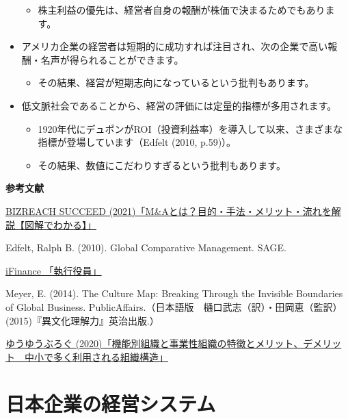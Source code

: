 \documentclass[
]{book}
\providecommand{\tightlist}{%
  \setlength{\itemsep}{0pt}\setlength{\parskip}{0pt}}
\begin{document}
\begin{itemize}
  \begin{itemize}
  \tightlist
  \item
    株主利益の優先は、経営者自身の報酬が株価で決まるためでもあります。
  \end{itemize}
\item
  アメリカ企業の経営者は短期的に成功すれば注目され、次の企業で高い報酬・名声が得られることができます。

  \begin{itemize}
  \tightlist
  \item
    その結果、経営が短期志向になっているという批判もあります。
  \end{itemize}
\item
  低文脈社会であることから、経営の評価には定量的指標が多用されます。

  \begin{itemize}
  \item
    1920年代にデュポンがROI（投資利益率）を導入して以来、さまざまな指標が登場しています（Edfelt (2010, p.59)）。
  \item
    その結果、数値にこだわりすぎるという批判もあります。
  \end{itemize}
\end{itemize}

{\textbf{参考文献}}

\href{https://br-succeed.jp/content/knowledge/post-1598}{BIZREACH SUCCEED (2021)「M\&Aとは？目的・手法・メリット・流れを解説【図解でわかる】」}

Edfelt, Ralph B. (2010). Global Comparative Management. SAGE.

\href{https://www.ifinance.ne.jp/glossary/management/man129.html}{iFinance 「執行役員」}

Meyer, E. (2014). The Culture Map: Breaking Through the Invisible Boundaries of Global Business. PublicAffairs.（日本語版　樋口武志（訳）・田岡恵（監訳）(2015)『異文化理解力』英治出版.）

\href{https://life-is-yuyu.com/consultant/business-management/function-divisional/}{ゆうゆうぶろぐ (2020)「機能別組織と事業性組織の特徴とメリット、デメリット　中小で多く利用される組織構造」}

\hypertarget{japan}{%
\chapter{日本企業の経営システム}\label{japan}}
\end{document}
